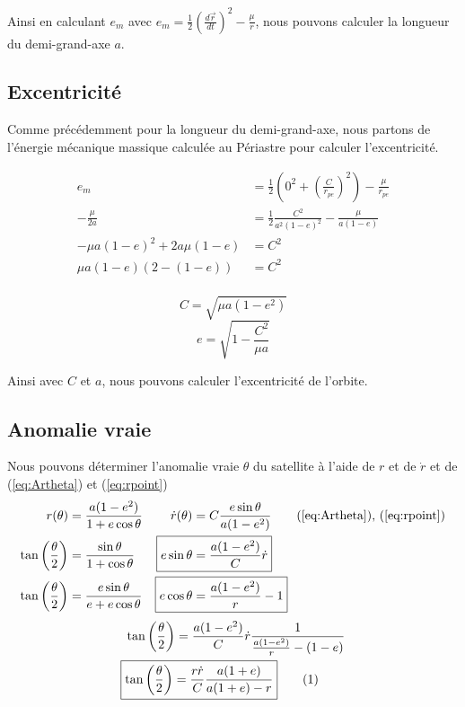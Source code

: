\documentclass{report}
\begin{document}
Ainsi en calculant $e_m$ avec $e_m=\frac{1}{2}\left(\frac{d\overrightarrow r}{dt}\right)^2-\frac{\mu}{r}$, nous pouvons calculer la longueur du demi-grand-axe $a$.

\subsection{Excentricité}

Comme précédemment pour la longueur du demi-grand-axe, nous partons de l'énergie mécanique massique calculée au Périastre pour calculer l'excentricité.

\begin{align*}
e_m&=\frac{1}{2}\left(0^2+\left(\frac{C}{r_{pe}}\right)^2\right)-\frac{\mu}{r_{pe}}\\
-\frac{\mu}{2a}&=\frac{1}{2}\frac{C^2}{a^2(1-e)^2}-\frac{\mu}{a(1-e)}\\
-\mu a(1-e)^2+2a\mu(1-e)&=C^2\\
\mu a(1-e)(2-(1-e))&=C^2\\
\end{align*}

\begin{equation}
\boxed{C=\sqrt{\mu a(1-e^2)}\label{eq:Ca}}
\end{equation}
\begin{equation}
\boxed{e=\sqrt{1-\frac{C^2}{\mu a}}\label{eq:e}}
\end{equation}

Ainsi avec $C$ et $a$, nous pouvons calculer l'excentricité de l'orbite.

\subsection{Anomalie vraie}

Nous pouvons déterminer l'anomalie vraie $\theta$ du satellite à l'aide de $r$ et de $\dot r$ et de (\ref{eq:Artheta}) et (\ref{eq:rpoint})
\begin{align*}
r(\theta)&=\frac{a(1-e^2)}{1+e\cos\theta}&\dot r(\theta)&=C\frac{e\sin\theta}{a(1-e^2)}\tag{\ref{eq:Artheta}), (\ref{eq:rpoint}}\\
\tan\left(\frac{\theta}{2}\right)&=\frac{\sin\theta}{1+\cos\theta}&\Aboxed{e\sin\theta&=\frac{a(1-e^2)}{C}\dot r}\\
\tan\left(\frac{\theta}{2}\right)&=\frac{e\sin\theta}{e+e\cos\theta}&\Aboxed{e\cos\theta&=\frac{a(1-e^2)}{r}-1}
\end{align*}
\begin{align*}
\tan\left(\frac{\theta}{2}\right)&=\frac{a(1-e^2)}{C}\dot r\frac{1}{\frac{a(1-e^2)}{r}-(1-e)}\\
\Aboxed{\tan\left(\frac{\theta}{2}\right)&=\frac{r\dot r}{C}\frac{a(1+e)}{a(1+e)-r}}
\stepcounter{equation}\tag{\theequation}\label{eq:tantheta/2}
\end{align*}
\end{document}
